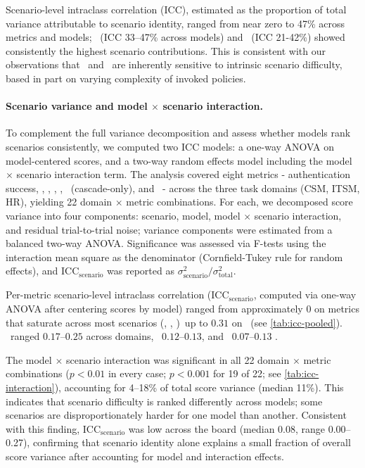 Scenario-level intraclass correlation (ICC), estimated as the proportion of total variance attributable to scenario identity, ranged from near zero to 47\% across metrics and models; \metrictaskcompletion~(ICC 33--47\% across models) and \metricfaithfulness~(ICC 21-42\%) showed consistently the highest scenario contributions. This is consistent with our observations that \metrictaskcompletion~and \metricfaithfulness~are inherently sensitive to intrinsic scenario difficulty, based in part on varying complexity of invoked policies.

%


\paragraph{Scenario variance and model $\times$ scenario interaction.} To complement the full variance decomposition and assess whether models rank scenarios consistently, we computed two ICC models: a one-way ANOVA on model-centered scores, and a two-way random effects model including the model $\times$ scenario interaction term. The analysis covered eight metrics - authentication success, \metricconcise, \metricconversationcompletion, \metricconversationprogression, \metrictaskcompletion, \metrictranscription~(cascade-only), and \metricturntaking~- across the three task domains (CSM, ITSM, HR), yielding 22 domain $\times$ metric combinations. For each, we decomposed score variance into four components: scenario, model, model $\times$ scenario interaction, and residual trial-to-trial noise; variance components were estimated from a balanced two-way ANOVA. Significance was assessed via F-tests using the interaction mean square as the denominator (Cornfield-Tukey rule for random effects), and ICC$_\text{scenario}$ was reported as $\sigma^2_\text{scenario} / \sigma^2_\text{total}$. 

Per-metric scenario-level intraclass correlation (ICC$_{\text{scenario}}$, computed via one-way ANOVA after centering scores by model) ranged from approximately $0$ on metrics that saturate across most scenarios (\metricfidelity, \metricvalidend, \metricturntaking)~up to $0.31$ on \metrictaskcompletion~(see \autoref{tab:icc-pooled}). \metricfaithfulness~ranged $0.17$--$0.25$ across domains, \metricconcise~$0.12$--$0.13$, and \metricconversationprogression~$0.07$--$0.13$ . 

The model $\times$ scenario interaction was significant in all 22 domain $\times$ metric combinations ($p < 0.01$ in every case; $p < 0.001$ for 19 of 22; see \autoref{tab:icc-interaction}), accounting for 4–18\% of total score variance (median 11\%). This indicates that scenario difficulty is ranked differently across models; some scenarios are disproportionately harder for one model than another. Consistent with this finding, ICC$_\text{scenario}$ was low across the board (median 0.08, range 0.00–0.27), confirming that scenario identity alone explains a small fraction of overall score variance after accounting for model and interaction effects.

